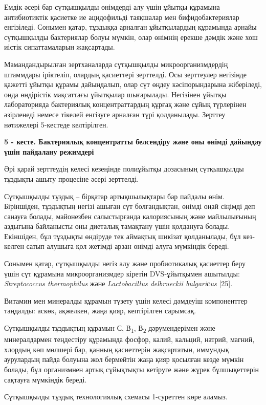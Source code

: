 Емдік әсері бар сүтқышқылды өнімдерді алу үшін ұйытқы құрамына
антибиотиктік қасиетке ие ацидофильді таяқшалар мен бифидобактериялар
енгізіледі. Сонымен қатар, тұздыққа арналған ұйытқылардың құрамында
арнайы сүтқышқылды бактериялар болуы мүмкін, олар өнімнің ерекше дәмдік
және хош иістік сипаттамаларын жақсартады.

Мамандандырылған зертханаларда сүтқышқылды микроорганизмдердің штаммдары
іріктеліп, олардың қасиеттері зерттелді. Осы зерттеулер негізінде
қажетті ұйытқы құрамы дайындалып, олар сүт өңдеу кәсіпорындарына
жіберіледі, онда өндірістік мақсаттағы ұйытқылар шығарылады. Негізінен
ұйытқы лабораторияда бактериялық концентраттардың құрғақ және сұйық
түрлерінен әзірленеді немесе тікелей енгізуге арналған түрі қолданылады.
Зерттеу нәтижелері 5-кестеде келтірілген.

{\bfseries 5 - кесте. Бактериялық концентратты белсендіру және оны өнімді дайындау үшін пайдалану режимдері}

Әрі қарай зерттеудің келесі кезеңінде полиұйытқы дозасының сүтқышқылды
тұздықты ашыту процесіне әсері зерттелді.

Сүтқышқылды тұздық -- бірқатар артықшылықтары бар пайдалы өнім.
Біріншіден, тұздықтың негізі ашыған сүт болғандықтан, өнімді оңай
сіңімді деп санауға болады, майонезбен салыстырғанда калориясының және
майлылығының аздығына байланысты оны диеталық тамақтану үшін қолдануға
болады. Екіншіден, бұл тұздықты өндіруде тек аймақтық шикізат
қолданылады, бұл кез-келген сатып алушыға қол жетімді арзан өнімді алуға
мүмкіндік береді.

Сонымен қатар, сүтқышқылды негіз алу және пробиотикалық қасиеттер беру
үшін сүт құрамына микроорганизмдер кіретін DVS-ұйытқымен ашытылды:
\emph{Streptococcus thermophilus} және \emph{Lactobacillus delbrueckii
bulgariсus} {[}25{]}.

Витамин мен минералды құрамын түзету үшін келесі дәмдеуіш компоненттер
таңдалды: аскөк, ақжелкен, жаңа қияр, кептірілген сарымсақ.

Сүтқышқылды тұздықтың құрамын С, В\textsubscript{1}, В\textsubscript{2}
дәрумендерімен және минералдармен теңдестіру құрамында фосфор, калий,
кальций, натрий, магний, хлордың көп мөлшері бар, қанның қасиеттерін
жақсартатын, иммундық аурулардың пайда болуына жол бермейтін жаңа қияр
қосылған кезде мүмкін болады, бұл организмнен артық сұйықтықты кетіруге
және жүрек бұлшықеттерін сақтауға мүмкіндік береді.

Сүтқышқылды тұздық технологиялық схемасы 1-суреттен көре аламыз.

